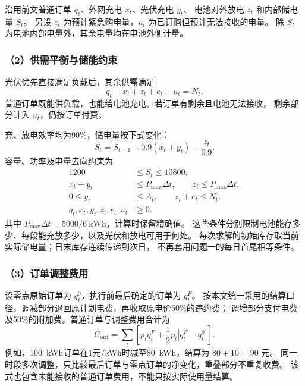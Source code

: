 沿用前文普通订单 $q_t$、外网充电 $x_t$、光伏充电 $y_t$、
电池对外放电 $z_t$ 和内部储电量 $S_t$。
另设 $e_t$ 为预计紧急购电量，$u_t$ 为已订购但预计无法接收的电量。
除 $S_t$ 为电池内部电量外，其余电量均在电池外侧计量。

\subsubsection*{（2）供需平衡与储能约束}

光伏优先直接满足负载后，其余供需满足
\begin{equation}
q_t-x_t+z_t+e_t-u_t=N_t.
\end{equation}
普通订单既能供负载，也能给电池充电。若订单有剩余且电池无法接收，
剩余部分计入 $u_t$，仍按订单付费。

充、放电效率均为90\%，储电量按下式变化：
\begin{equation}
S_t=S_{t-1}+0.9(x_t+y_t)-\frac{z_t}{0.9}.
\end{equation}
容量、功率及电量去向约束为
\begin{equation}
\begin{aligned}
1200&\leq S_t\leq10800,\\
x_t+y_t&\leq P_{\max}\Delta t,\qquad z_t\leq P_{\max}\Delta t,\\
0\leq y_t&\leq A_t,\qquad z_t+e_t\leq N_t,\\
q_t,x_t,y_t,z_t,e_t,u_t&\geq0.
\end{aligned}
\end{equation}
其中 $P_{\max}\Delta t=5000/6\ \mathrm{kWh}$，计算时保留精确值。
这些条件分别限制电池能存多少、每段能充放多少，以及光伏和放电可用于何处。
每次求解的初始库存取当前实际储电量；日末库存连续传递到次日，
不再套用问题一的每日首尾相等条件。

\subsubsection*{（3）订单调整费用}

设零点原始订单为 $q_t^0$，执行前最后确定的订单为 $q_t^F$。
按本文统一采用的结算口径，调减部分退回原计划电费，再收取原电价50\%的违约费；
调增部分支付电费及50\%的附加费。普通订单与调整费用合计为
\begin{equation}
C_{\mathrm{ord}}=\sum_t\left[p_tq_t^F+\frac12p_t|q_t^F-q_t^0|\right].
\end{equation}
例如，100~kWh订单在1元/kWh时减至80~kWh，结算为 $80+10=90$ 元。
同一时段多次调整，只比较最后订单与零点订单的净变化，重叠部分不重复收费。
该式也包含未能接收的普通订单费用，不能只按实际使用量结算。

